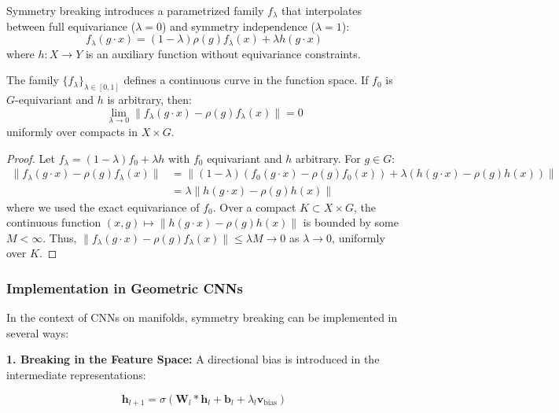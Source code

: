 Symmetry breaking introduces a parametrized family $f_\lambda$ that interpolates between full equivariance ($\lambda = 0$) and symmetry independence ($\lambda = 1$):
\begin{equation}
f_\lambda(g \cdot x) = (1-\lambda) \rho(g) f_\lambda(x) + \lambda h(g \cdot x)
\end{equation}
where $h: X \to Y$ is an auxiliary function without equivariance constraints.

\begin{proposition}
The family $\{f_\lambda\}_{\lambda \in [0,1]}$ defines a continuous curve in the function space. If $f_0$ is $G$-equivariant and $h$ is arbitrary, then:
\begin{equation}
\lim_{\lambda \to 0} \|f_\lambda(g \cdot x) - \rho(g) f_\lambda(x)\| = 0
\end{equation}
uniformly over compacts in $X \times G$.
\end{proposition}

\begin{proof}
Let $f_\lambda = (1-\lambda) f_0 + \lambda h$ with $f_0$ equivariant and $h$ arbitrary. For $g \in G$:
\begin{align}
\|f_\lambda(g \cdot x) - \rho(g) f_\lambda(x)\| &= \|(1-\lambda)(f_0(g \cdot x) - \rho(g) f_0(x)) + \lambda(h(g \cdot x) - \rho(g) h(x))\| \\
&= \lambda \|h(g \cdot x) - \rho(g) h(x)\|
\end{align}
where we used the exact equivariance of $f_0$. Over a compact $K \subset X \times G$, the continuous function $(x,g) \mapsto \|h(g \cdot x) - \rho(g) h(x)\|$ is bounded by some $M < \infty$. Thus, $\|f_\lambda(g \cdot x) - \rho(g) f_\lambda(x)\| \leq \lambda M \to 0$ as $\lambda \to 0$, uniformly over $K$.
\end{proof}

\subsubsection{Implementation in Geometric CNNs}

In the context of CNNs on manifolds, symmetry breaking can be implemented in several ways:

\textbf{1. Breaking in the Feature Space:} A directional bias is introduced in the intermediate representations:

\begin{equation}
\mathbf{h}_{l+1} = \sigma(\mathbf{W}_l * \mathbf{h}_l + \mathbf{b}_l + \lambda_l \mathbf{v}_{\text{bias}})
\end{equation}

